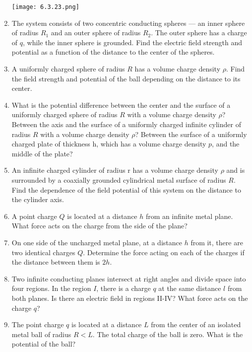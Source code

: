 \documentclass{article}
\begin{document}
\begin{enumerate}[label=6.3.\arabic*]
\begin{center}
    \texttt{[image: 6.3.23.png]}
\end{center}

\item The system consists of two concentric conducting spheres — an inner sphere of radius $R_1$ and an outer sphere of radius $R_2$. The outer sphere has a charge of $q$, while the inner sphere is grounded. Find the electric field strength and potential as a function of the distance to the center of the spheres.

\item A uniformly charged sphere of radius $R$ has a volume charge density $\rho$. Find the field strength and potential of the ball depending on the distance to its center.

\item What is the potential difference between the center and the surface of a uniformly charged sphere of radius $R$ with a volume charge density $\rho$? Between the axis and the surface of a uniformly charged infinite cylinder of radius $R$ with a volume charge density $\rho$? Between the surface of a uniformly charged plate of thickness h, which has a volume charge density $p$, and the middle of the plate?

\item An infinite charged cylinder of radius r has a volume charge density $\rho$ and is surrounded by a coaxially grounded cylindrical metal surface of radius $R$. Find the dependence of the field potential of this system on the distance to the cylinder axis.

\item A point charge $Q$ is located at a distance $h$ from an infinite metal plane. What force acts on the charge from the side of the plane?

\item On one side of the uncharged metal plane, at a distance $h$ from it, there are two identical charges $Q$. Determine the force acting on each of the charges if the distance between them is $2h$.

\item Two infinite conducting planes intersect at right angles and divide space into four regions. In the region $I$, there is a charge $q$ at the same distance $l$ from both planes. Is there an electric field in regions II-IV? What force acts on the charge $q$?

\item The point charge $q$ is located at a distance $L$ from the center of an isolated metal ball of radius $R < L$. The total charge of the ball is zero. What is the potential of the ball?


\end{enumerate}
\end{document}

